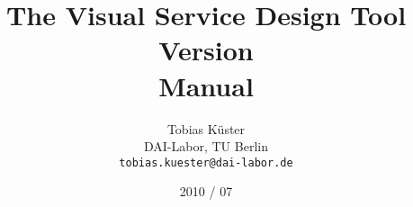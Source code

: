 \documentclass{scrreprt}
\title{\huge The Visual Service Design Tool \\
       \vspace{1cm} 
       \LARGE Version \version \\
       \LARGE Manual}
\date{2010 / 07}
\author{Tobias K\"uster\\
        DAI-Labor, TU Berlin\\
        \texttt{tobias.kuester@dai-labor.de}}
\begin{document}
	\maketitle

	\tableofcontents

	

	
	
	
	
	
	
%	


	\begin{appendix}
		
		
		
	\end{appendix}

	
\end{document}
